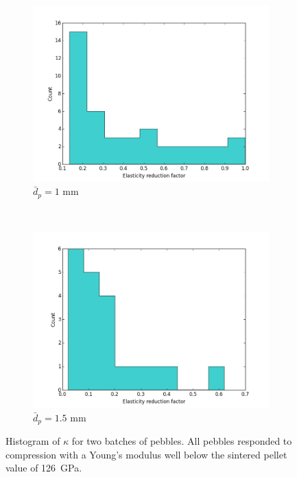 \begin{figure}
        \centering
        \begin{subfigure}[b]{\doubleimagewidth}
                \includegraphics[width=\textwidth]{chapters/figures/nfri-1mm-kappa-histogram.png}
                \caption{$\bar{d}_p = 1$ mm}
                \label{fig:nfri-1mm-kappa-hist}
        \end{subfigure}
        ~
        \begin{subfigure}[b]{\doubleimagewidth}
                \includegraphics[width=\textwidth]{chapters/figures/nfri-1.5mm-kappa-histogram.png}
                \caption{$\bar{d}_p = 1.5$ mm}
                \label{fig:nfri-1.5mm-kappa-hist}
        \end{subfigure}
        \caption{Histogram of $\kappa$ for two batches of \lit pebbles. All pebbles responded to compression with a Young's modulus well below the sintered pellet value of \si{126 GPa}.}\label{fig:nfri-kappa-hist}
\end{figure}


